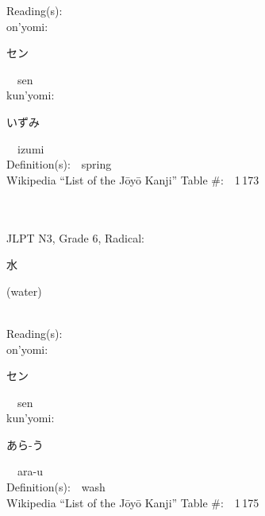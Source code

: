 \begin{multicols}{2}
Reading(s):\ \ \\
{\hspace*{1em}}on'yomi:\ \ \\
{\hspace*{2em}}{\begin{CJK}{UTF8}{min} セン \end{CJK}}\ \ sen\ \ \\
{\hspace*{1em}}kun'yomi:\ \ \\
{\hspace*{2em}}{\begin{CJK}{UTF8}{min} いずみ \end{CJK}}\ \ izumi\ \ \\
Definition(s):\ \ spring \\
Wikipedia ``List of the J\=oy\=o Kanji'' Table \#:\ \ 1\,173 \\
\ \ \\
{\fontsize{34pt}{40pt}  }\ \ \\  %
{JLPT N3, Grade 6, Radical:\ \ {\begin{CJK}{UTF8}{min} 水 \end{CJK}} (water) } \\
Reading(s):\ \ \\
{\hspace*{1em}}on'yomi:\ \ \\
{\hspace*{2em}}{\begin{CJK}{UTF8}{min} セン \end{CJK}}\ \ sen\ \ \\
{\hspace*{1em}}kun'yomi:\ \ \\
{\hspace*{2em}}{\begin{CJK}{UTF8}{min} あら-う \end{CJK}}\ \ ara-u\ \ \\
Definition(s):\ \ wash \\
Wikipedia ``List of the J\=oy\=o Kanji'' Table \#:\ \ 1\,175 \\
\ \ \\
{\fontsize{34pt}{40pt}  }\ \ \\  %

\end{multicols}

